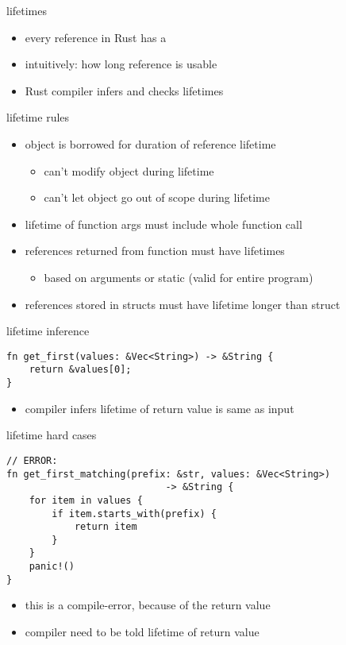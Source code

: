 
\begin{frame}{lifetimes}
    \begin{itemize}
    \item every reference in Rust has a 
    \item intuitively: how long reference is usable
    \item Rust compiler infers and checks lifetimes
    \end{itemize}
\end{frame}

\begin{frame}{lifetime rules}
    \begin{itemize}
    \item object is borrowed for duration of reference lifetime
        \begin{itemize}
        \item can't modify object during lifetime
        \item can't let object go out of scope during lifetime
        \end{itemize}
    \item lifetime of function args must include whole function call
    \item references returned from function must have lifetimes
        \begin{itemize}
        \item based on arguments or static (valid for entire program)
        \end{itemize}
    \item references stored in structs must have lifetime longer than struct
    \end{itemize}
\end{frame}

\begin{frame}[fragile,label=lifetimeHard]{lifetime inference}
\begin{verbatim}
fn get_first(values: &Vec<String>) -> &String {
    return &values[0];
}
\end{verbatim}
\begin{itemize}
    \item compiler infers lifetime of return value is same as input
\end{itemize}
\end{frame}

\begin{frame}[fragile,label=lifetimeHard2]{lifetime hard cases}
\begin{verbatim}
// ERROR:
fn get_first_matching(prefix: &str, values: &Vec<String>)
                            -> &String {
    for item in values {
        if item.starts_with(prefix) {
            return item
        }
    }
    panic!()
}
\end{verbatim}
\begin{itemize}
    \item this is a compile-error, because of the return value
    \item compiler need to be told lifetime of return value
\end{itemize}
\end{frame}

